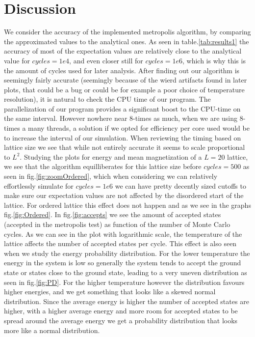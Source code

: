 \documentclass{emulateapj}
\begin{document}
\section{Discussion}
\label{sec:discussion}
%
We consider the accuracy of the implemented metropolis algorithm, by comparing the approximated values to the analytical ones. As seen in table.\ref{tab:results1} the accuracy of most of the expectation values are relatively close to the analytical value for $cycles = 1e4$, and even closer still for $cycles = 1e6$, which is why this is the amount of cycles used for later analysis.
%
\newline
\newline
%
After finding out our algorithm is seemingly fairly accurate (seemingly because of the wierd artifacts found in later plots, that could be a bug or could be for example a poor choice of temperature resolution), it is natural to check the CPU time of our program. The parallelization of our program provides a significant boost to the CPU-time on the same interval. However nowhere near 8-times as much, when we are using 8-times a many threads, a solution if we opted for efficiency per core used would be to increase the interval of our simulation. When reviewing the timing based on lattice size we see that while not entirely accurate it seems to scale proportional to $L^2$.
%
\newline
\newline
Studying the plots for energy and mean magnetization of a $L=20$ lattice, we see that the algorithm equilliberates for this lattice size before $cycles=500$ as seen in fig.\ref{fig:zoomOrdered}, which when considering we can relatively effortlessly simulate for $cycles = 1e6$ we can have pretty decently sized cutoffs to make sure our expectation values are not affected by the disordered start of the lattice. For ordered lattice this effect does not happen and as we see in the graphs fig.\ref{fig:Ordered}. In fig.\ref{fig:accepts} we see the amount of accepted states (accepted in the metropolis test) as function of the number of Monte Carlo cycles. As we can see in the plot with logarithmic scale, the temperature of the lattice affects the number of accepted states per cycle. This effect is also seen when we study the energy probability distribution. For the lower temperature the energy in the system is low so generally the system tends to accept the ground state or states close to the ground state, leading to a very uneven distribution as seen in fig.\ref{fig:PD}. For the higher temperature however the distribution favours higher energies, and we get something that looks like a skewed normal distribution. Since the average energy is higher the number of accepted states are higher, with a higher average energy and more room for accepted states to be spread around the average energy we get a probability distribution that looks more like a normal distribution.
\end{document}
